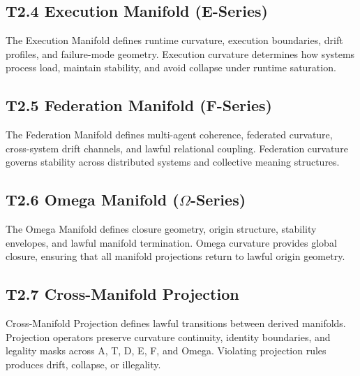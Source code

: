 \subsection{T2.4 Execution Manifold (E-Series)}
The Execution Manifold defines runtime curvature, execution boundaries, drift
profiles, and failure-mode geometry. Execution curvature determines how systems
process load, maintain stability, and avoid collapse under runtime saturation.

\subsection{T2.5 Federation Manifold (F-Series)}
The Federation Manifold defines multi-agent coherence, federated curvature,
cross-system drift channels, and lawful relational coupling. Federation
curvature governs stability across distributed systems and collective meaning
structures.

\subsection{T2.6 Omega Manifold ($\Omega$-Series)}
The Omega Manifold defines closure geometry, origin structure, stability
envelopes, and lawful manifold termination. Omega curvature provides global
closure, ensuring that all manifold projections return to lawful origin
geometry.

\subsection{T2.7 Cross-Manifold Projection}
Cross-Manifold Projection defines lawful transitions between derived manifolds.
Projection operators preserve curvature continuity, identity boundaries, and
legality masks across A, T, D, E, F, and Omega. Violating projection rules
produces drift, collapse, or illegality.
